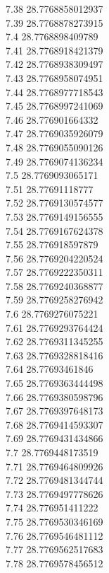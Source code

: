 {7.38	28.7768858012937\\
7.39	28.7768878273915\\
7.4	28.7768898409789\\
7.41	28.7768918421379\\
7.42	28.7768938309497\\
7.43	28.7768958074951\\
7.44	28.7768977718543\\
7.45	28.7768997241069\\
7.46	28.776901664332\\
7.47	28.7769035926079\\
7.48	28.7769055090126\\
7.49	28.7769074136234\\
7.5	28.7769093065171\\
7.51	28.77691118777\\
7.52	28.7769130574577\\
7.53	28.7769149156555\\
7.54	28.7769167624378\\
7.55	28.776918597879\\
7.56	28.7769204220524\\
7.57	28.7769222350311\\
7.58	28.7769240368877\\
7.59	28.7769258276942\\
7.6	28.7769276075221\\
7.61	28.7769293764424\\
7.62	28.7769311345255\\
7.63	28.7769328818416\\
7.64	28.77693461846\\
7.65	28.7769363444498\\
7.66	28.7769380598796\\
7.67	28.7769397648173\\
7.68	28.7769414593307\\
7.69	28.7769431434866\\
7.7	28.7769448173519\\
7.71	28.7769464809926\\
7.72	28.7769481344744\\
7.73	28.7769497778626\\
7.74	28.776951411222\\
7.75	28.7769530346169\\
7.76	28.7769546481112\\
7.77	28.7769562517683\\
7.78	28.7769578456512\\
}
